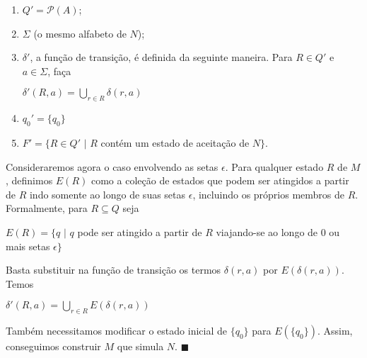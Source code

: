 \documentclass[12pt,a4paper,oneside]{article}
\begin{document}
	\begin{enumerate}
		\item $Q' = \mathcal{P}(A)$;
		\item $\Sigma$ (o mesmo alfabeto de $N$);
		\item $\delta'$, a função de transição, é definida da seguinte maneira. Para $R \in Q'$ e $a \in \Sigma$, faça 
			\begin{center}
				$\delta'(R,a) = \bigcup\limits_{r \in R} \delta (r,a)$
			\end{center}
		\item $q_0' = \{ q_0 \}$
		\item $F' = \{ R \in Q' \mbox{ | } R$ contém um estado de aceitação de $N \}$.
	\end{enumerate}

Consideraremos agora o caso envolvendo as setas $\epsilon$. Para qualquer estado $R$ de $M$, definimos $E(R)$ como a coleção de estados que podem ser atingidos a partir de $R$ indo somente ao longo de suas setas $\epsilon$, incluindo os próprios membros de $R$. Formalmente, para $R \subseteq Q$ seja
	\begin{center}
		$E(R) = \{q \mbox{ | } q$ pode ser atingido a partir de $R$ viajando-se ao longo de 0 ou mais setas $\epsilon \}$	
	\end{center}	
	Basta substituir na função de transição os termos $\delta(r,a)$ por $E(\delta(r,a))$. Temos
			\begin{center}
				$\delta'(R,a) = \bigcup\limits_{r \in R} E(\delta (r,a))$
			\end{center}
Também necessitamos modificar o estado inicial de $\{ q_0 \}$ para $E(\{ q_0 \})$. Assim, conseguimos construir $M$ que simula $N$. $\blacksquare$
\end{document}

